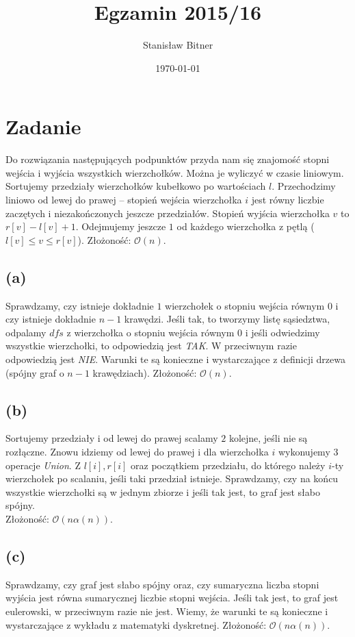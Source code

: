 \documentclass[12pt, a4paper]{article}
\title{Egzamin 2015/16}
\author{Stanisław Bitner}
\date{\today}
\newcommand{\MCALO}{\mathcal{O}}
\newcounter{zadanie}
\newcommand{\zadanie}{\addtocounter{zadanie}{1}\section*{Zadanie \arabic{zadanie}}}
\begin{document}
\maketitle
\zadanie{}

Do rozwiązania następujących podpunktów przyda nam się znajomość stopni wejścia
i wyjścia wszystkich wierzchołków. Można je wyliczyć w czasie liniowym.
Sortujemy przedziały wierzchołków kubełkowo po wartościach $l$. Przechodzimy
liniowo od lewej do prawej -- stopień wejścia wierzchołka $i$ jest równy
liczbie zaczętych i niezakończonych jeszcze przedziałów. Stopień wyjścia
wierzchołka $v$ to $r[v] - l[v] + 1$. Odejmujemy jeszcze $1$ od każdego
wierzchołka z pętlą ($l[v] \le v \le r[v]$).
Złożoność: $\MCALO(n)$.

\subsection*{(a)}
Sprawdzamy, czy istnieje dokładnie $1$ wierzchołek o stopniu wejścia równym $0$
i czy istnieje dokładnie $n-1$ krawędzi. Jeśli tak, to tworzymy listę
sąsiedztwa, odpalamy $dfs$ z wierzchołka o stopniu wejścia równym $0$ i jeśli
odwiedzimy wszystkie wierzchołki, to odpowiedzią jest \textit{TAK}.
W przeciwnym razie odpowiedzią jest \textit{NIE}. Warunki te są konieczne
i wystarczające z definicji drzewa (spójny graf o $n-1$ krawędziach).
Złożoność: $\MCALO(n)$.

\subsection*{(b)}
Sortujemy przedziały i od lewej do prawej scalamy $2$ kolejne, jeśli nie są
rozłączne. Znowu idziemy od lewej do prawej i dla wierzchołka $i$ wykonujemy
$3$ operacje \textit{Union}. Z $l[i], r[i]$ oraz początkiem przedziału, do
którego należy $i$-ty wierzchołek po scalaniu, jeśli taki przedział istnieje.
Sprawdzamy, czy na końcu wszystkie wierzchołki są w jednym zbiorze i jeśli tak
jest, to graf jest słabo spójny.\\
Złożoność: $\MCALO(n\alpha(n))$.

\subsection*{(c)}
Sprawdzamy, czy graf jest słabo spójny oraz, czy sumaryczna liczba stopni
wyjścia jest równa sumarycznej liczbie stopni wejścia. Jeśli tak jest, to graf
jest eulerowski, w przeciwnym razie nie jest. Wiemy, że warunki te są konieczne
i wystarczające z wykładu z matematyki dyskretnej.
Złożoność: $\MCALO(n\alpha(n))$.
\end{document}
